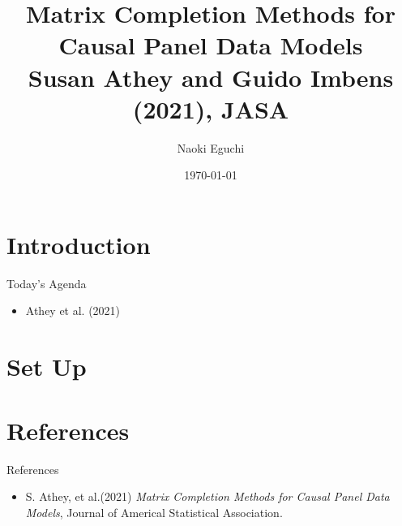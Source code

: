 \documentclass[xcolor=svgnames,aspectratio=169]{beamer}
\begin{document}
 

\title{Matrix Completion Methods for Causal Panel Data Models \\ \small{Susan Athey and Guido Imbens (2021), JASA}}
\author{Naoki Eguchi}          
\date{\today}

\begin{frame}                  
    \titlepage                     
\end{frame}

\section{Introduction}

\begin{frame}{Today's Agenda}
    \begin{itemize}
        \item Athey et al. (2021)
    \end{itemize}
\end{frame}

\section{Set Up}

\section{References}

\begin{frame}{References}
    \begin{itemize}
        \item S. Athey, et al.(2021) \textit{Matrix Completion Methods for Causal Panel
        Data Models}, Journal of Americal Statistical Association.
    \end{itemize}
\end{frame}
\end{document}
